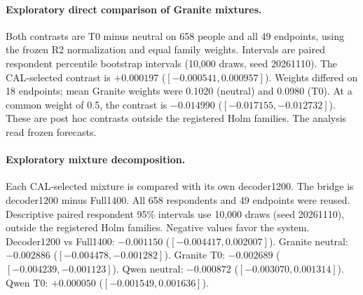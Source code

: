 \documentclass[10pt]{article}
\begin{document}
\paragraph{Exploratory direct comparison of Granite mixtures.}
Both contrasts are T0 minus neutral on 658 people and all 49 endpoints,
using the frozen R2 normalization and equal family weights. Intervals
are paired respondent percentile bootstrap intervals (10,000 draws,
seed 20261110). The CAL-selected contrast is $+0.000197$
($[-0.000541,0.000957]$). Weights differed on 18 endpoints;
mean Granite weights were 0.1020 (neutral) and 0.0980 (T0).
At a common weight of 0.5, the contrast is $-0.014990$
($[-0.017155,-0.012732]$). These are post hoc contrasts outside the
registered Holm families. The analysis read frozen forecasts.
\paragraph{Exploratory mixture decomposition.}
Each CAL-selected mixture is compared with its own decoder1200. The bridge is decoder1200 minus Full1400. All 658 respondents and 49 endpoints were reused. Descriptive paired respondent 95\% intervals use 10,000 draws (seed 20261110), outside the registered Holm families. Negative values favor the system.
Decoder1200 vs Full1400: $-0.001150$ ($[-0.004417,0.002007]$).
Granite neutral: $-0.002886$ ($[-0.004478,-0.001282]$).
Granite T0: $-0.002689$ ($[-0.004239,-0.001123]$).
Qwen neutral: $-0.000872$ ($[-0.003070,0.001314]$).
Qwen T0: $+0.000050$ ($[-0.001549,0.001636]$).
\end{document}
